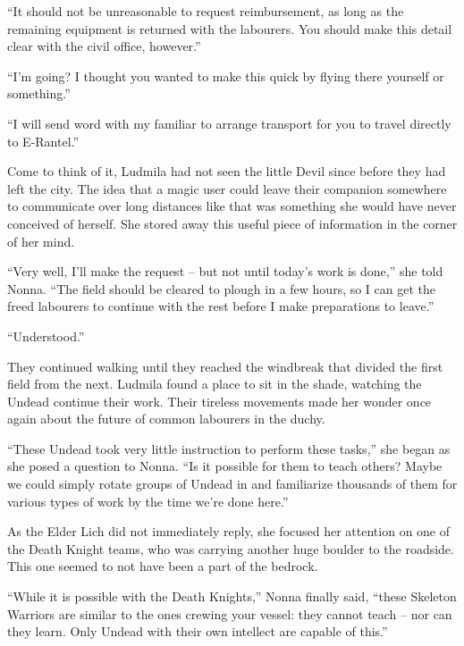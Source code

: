  

“It should not be unreasonable to request reimbursement, as long as the remaining equipment is returned with the labourers. You should make this detail clear with the civil office, however.”

 

“I’m going? I thought you wanted to make this quick by flying there yourself or something.”

 

“I will send word with my familiar to arrange transport for you to travel directly to E-Rantel.”

 

Come to think of it, Ludmila had not seen the little Devil since before they had left the city. The idea that a magic user could leave their companion somewhere to communicate over long distances like that was something she would have never conceived of herself. She stored away this useful piece of information in the corner of her mind.

 

“Very well, I’ll make the request – but not until today’s work is done,” she told Nonna. “The field should be cleared to plough in a few hours, so I can get the freed labourers to continue with the rest before I make preparations to leave.”

 

“Understood.”

 

They continued walking until they reached the windbreak that divided the first field from the next. Ludmila found a place to sit in the shade, watching the Undead continue their work. Their tireless movements made her wonder once again about the future of common labourers in the duchy.

 

“These Undead took very little instruction to perform these tasks,” she began as she posed a question to Nonna. “Is it possible for them to teach others? Maybe we could simply rotate groups of Undead in and familiarize thousands of them for various types of work by the time we’re done here.”

 

As the Elder Lich did not immediately reply, she focused her attention on one of the Death Knight teams, who was carrying another huge boulder to the roadside. This one seemed to not have been a part of the bedrock.

 

“While it is possible with the Death Knights,” Nonna finally said, “these Skeleton Warriors are similar to the ones crewing your vessel: they cannot teach – nor can they learn. Only Undead with their own intellect are capable of this.”

